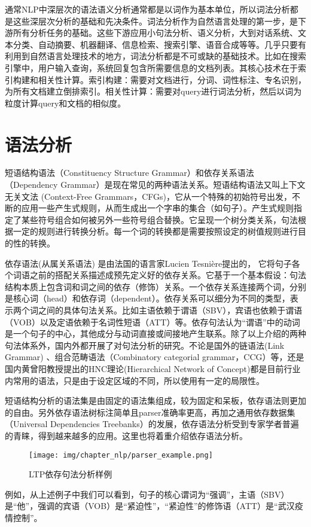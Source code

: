 \documentclass[graybox,envcountchap,sectrefs]{svmono}
\begin{document}
通常NLP中深层次的语法语义分析通常都是以词作为基本单位，所以词法分析都是这些深层次分析的基础和先决条件。词法分析作为自然语言处理的第一步，是下游所有分析任务的基础。这些下游应用小句法分析、语义分析，大到对话系统、文本分类、自动摘要、机器翻译\cite{chang2008optimizing}、信息检索、搜索引擎、语音合成等等。几乎只要有利用到自然语言处理技术的地方，词法分析都是不可或缺的基础技术。比如在搜索引擎中，用户输入查询，系统回复包含所需要信息的文档列表。其核心技术在于索引构建和相关性计算。索引构建：需要对文档进行，分词、词性标注、专名识别，为所有文档建立倒排索引。相关性计算：需要对query进行词法分析，然后以词为粒度计算query和文档的相似度。


\section{语法分析}

短语结构语法（Constituency Structure Grammar）和依存关系语法（Dependency Grammar）是现在常见的两种语法关系。短语结构语法又叫上下文无关文法 (Context-Free Grammars，CFGs)，它从一个特殊的初始符号出发，不断的应用一些产生式规则，从而生成出一个字串的集合（如句子）。产生式规则指定了某些符号组合如何被另外一些符号组合替换。它呈现一个树分类关系，句法根据一定的规则进行转换分析。每一个词的转换都是需要按照设定的树值规则进行目的性的转换。

依存语法(从属关系语法) 是由法国的语言家Lucien Tesnière提出的\cite{tesniere1959elements}，
它将句子各个词语之前的搭配关系描述成预先定义好的依存关系。它基于一个基本假设：句法结构本质上包含词和词之间的依存（修饰）关系。一个依存关系连接两个词，分别是核心词（head）和依存词（dependent）。依存关系可以细分为不同的类型，表示两个词之间的具体句法关系。比如主语依赖于谓语（SBV），宾语也依赖于谓语（VOB）以及定语依赖于名词性短语（ATT）等。依存句法认为“谓语”中的动词是一个句子的中心，其他成分与动词直接或间接地产生联系。除了以上介绍的两种句法体系外，国内外都开展了对句法分析的研究。不论是国外的链语法(Link Grammar) 、组合范畴语法（Combinatory categorial grammar，CCG）等，还是国内黄曾阳教授提出的HNC理论(Hierarchical Network of Concept)\cite{黄曾阳:12}都是目前行业内常用的语法，只是由于设定区域的不同，所以使用有一定的局限性。

短语结构分析的语法集是由固定的语法集组成，较为固定和呆板，依存语法则更加的自由。另外依存语法树标注简单且parser准确率更高，再加之通用依存数据集（Universal Dependencies Treebanks）的发展，依存语法分析受到专家学者普遍的青睐，得到越来越多的应用。这里也将着重介绍依存语法分析。

\begin{figure}[h]
\centering
\texttt{[image: img/chapter\_nlp/parser\_example.png]}
\caption{LTP依存句法分析样例}
\label{fig:parserexample}
\end{figure}
例如，从上述例子中我们可以看到，句子的核心谓词为“强调”，主语（SBV）是“他”，强调的宾语（VOB）是“紧迫性”，“紧迫性”的修饰语（ATT）是“武汉疫情控制”。
\end{document}
